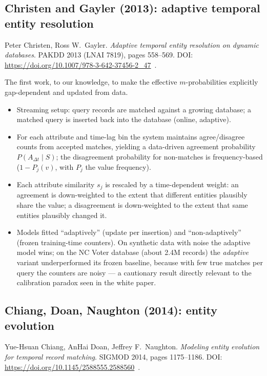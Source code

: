 \documentclass[11pt]{article}
\newcommand{\dt}{\Delta t}
\begin{document}
\subsection{Christen and Gayler (2013): adaptive temporal entity resolution}

Peter Christen, Ross W.\ Gayler.
\emph{Adaptive temporal entity resolution on dynamic databases}.
PAKDD 2013 (LNAI 7819), pages 558--569.
DOI: \url{https://doi.org/10.1007/978-3-642-37456-2\_47}~\cite{cg2013}.

The first work, to our knowledge, to make the effective $m$-probabilities explicitly
gap-dependent and updated from data.
\begin{itemize}[leftmargin=*]
  \item Streaming setup: query records are matched against a growing database; a matched
        query is inserted back into the database (online, adaptive).
  \item For each attribute and time-lag bin the system maintains agree/disagree counts from
        accepted matches, yielding a data-driven agreement probability
        $P(A_{\dt}\mid S)$; the disagreement probability for non-matches is
        frequency-based ($1-P_j(v)$, with $P_j$ the value frequency).
  \item Each attribute similarity $s_j$ is rescaled by a time-dependent weight: an
        agreement is down-weighted to the extent that different entities plausibly share
        the value; a disagreement is down-weighted to the extent that same entities
        plausibly changed it.
  \item Models fitted ``adaptively'' (update per insertion) and ``non-adaptively''
        (frozen training-time counters). On synthetic data with noise the adaptive model
        wins; on the NC Voter database (about 2.4M records) the \emph{adaptive} variant
        underperformed its frozen baseline, because with few true matches per query the
        counters are noisy --- a cautionary result directly relevant to the calibration
        paradox seen in the white paper.
\end{itemize}

\subsection{Chiang, Doan, Naughton (2014): entity evolution}

Yue-Hsuan Chiang, AnHai Doan, Jeffrey F.\ Naughton.
\emph{Modeling entity evolution for temporal record matching}.
SIGMOD 2014, pages 1175--1186.
DOI: \url{https://doi.org/10.1145/2588555.2588560}~\cite{cd14}.
\end{document}
